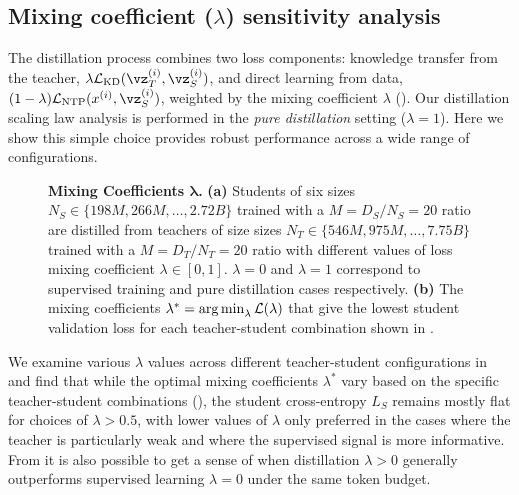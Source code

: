\subsection{Mixing coefficient (\texorpdfstring{$\lambda$}{lambda}) sensitivity analysis}
\label{ssec:lambda-sensitivity}

The distillation process combines two loss components: knowledge transfer from the teacher, $\lambda \Ls_{\text{KD}}(\vz_T^{(i)},\vz_S^{(i)})$, and direct learning from data, $(1-\lambda) \Ls_{\text{NTP}}(x^{(i)},\vz_S^{(i)})$, weighted by the mixing coefficient $\lambda$ (). Our distillation scaling law analysis
is performed in the \emph{pure distillation} setting ($\lambda=1$).
Here we show this simple choice provides robust performance across a wide range of configurations.

\begin{figure}[h]
	\centering
	\caption{\textbf{Mixing Coefficients $\bm \lambda$.}
		\textbf{(a)} Students of six sizes $N_S\in\{198M,266M,\ldots,2.72B\}$ trained with a $M=D_S/N_S=20$ ratio are distilled from teachers of size sizes $N_T\in\{546M, 975M,\ldots,7.75B\}$ trained with a $M=D_T/N_T=20$ ratio with different values of loss mixing coefficient $\lambda\in[0,1]$. $\lambda=0$ and $\lambda=1$ correspond to supervised training and pure distillation cases respectively.
		\textbf{(b)} The mixing coefficients $\lambda^*=\operatorname*{arg\,min}_\lambda \mathcal{L}(\lambda)$ that give the lowest student validation loss for each teacher-student combination shown in .}
	\label{fig:mixing-sensitivity}
\end{figure}

We examine various $\lambda$ values across different teacher-student configurations in  and find that while the optimal mixing coefficients $\lambda^*$ vary based on the specific teacher-student combinations (),
the student cross-entropy $L_S$
remains mostly flat for choices of $\lambda > 0.5$,
with lower values of $\lambda$
only preferred in the cases where the teacher is particularly weak and where the supervised signal is more informative.
From  it is also possible to get a sense of when distillation $\lambda > 0$ generally outperforms supervised learning $\lambda=0$ under the same token budget.

